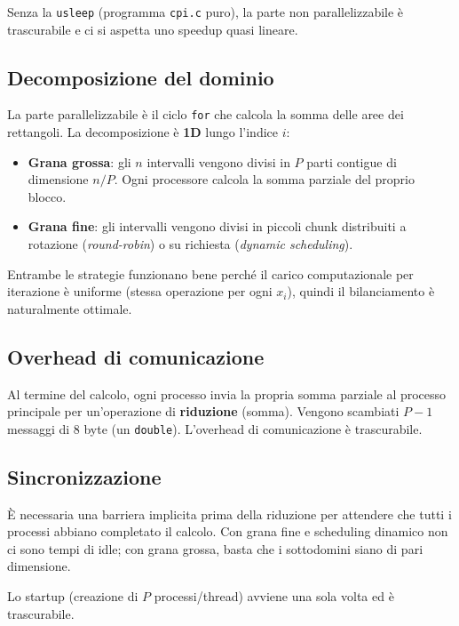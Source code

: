 \documentclass[a4paper,12pt]{article}
\begin{document}
Senza la \texttt{usleep} (programma \texttt{cpi.c} puro), la parte non parallelizzabile \`e trascurabile e ci si aspetta uno speedup quasi lineare.

\subsection{Decomposizione del dominio}

La parte parallelizzabile \`e il ciclo \texttt{for} che calcola la somma delle aree dei rettangoli. La decomposizione \`e \textbf{1D} lungo l'indice $i$:

\begin{itemize}
    \item \textbf{Grana grossa}: gli $n$ intervalli vengono divisi in $P$ parti contigue di dimensione $n/P$. Ogni processore calcola la somma parziale del proprio blocco.
    \item \textbf{Grana fine}: gli intervalli vengono divisi in piccoli chunk distribuiti a rotazione (\textit{round-robin}) o su richiesta (\textit{dynamic scheduling}).
\end{itemize}

Entrambe le strategie funzionano bene perch\'e il carico computazionale per iterazione \`e uniforme (stessa operazione per ogni $x_i$), quindi il bilanciamento \`e naturalmente ottimale.

\subsection{Overhead di comunicazione}

Al termine del calcolo, ogni processo invia la propria somma parziale al processo principale per un'operazione di \textbf{riduzione} (somma). Vengono scambiati $P-1$ messaggi di 8 byte (un \texttt{double}). L'overhead di comunicazione \`e trascurabile.

\subsection{Sincronizzazione}

\`E necessaria una barriera implicita prima della riduzione per attendere che tutti i processi abbiano completato il calcolo. Con grana fine e scheduling dinamico non ci sono tempi di idle; con grana grossa, basta che i sottodomini siano di pari dimensione.

Lo startup (creazione di $P$ processi/thread) avviene una sola volta ed \`e trascurabile.
\end{document}
